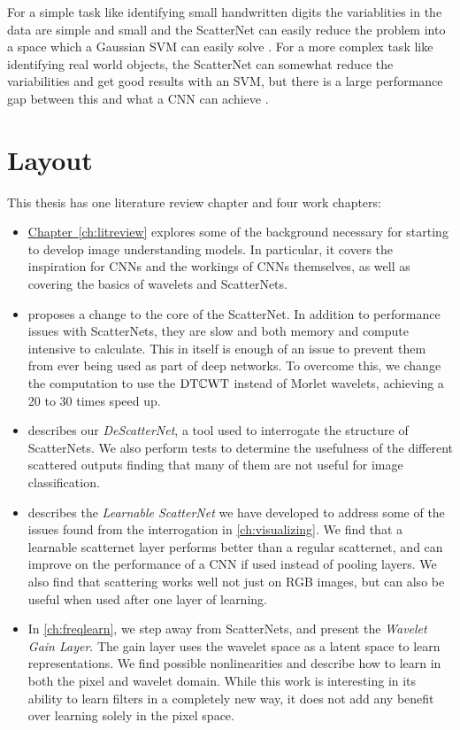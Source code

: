 For a simple task like identifying small handwritten digits
the variablities in the data are simple and small and the ScatterNet can easily
reduce the problem into a space which a Gaussian SVM can easily solve
\cite{bruna_invariant_2013}. For a more complex task like identifying real world
objects, the ScatterNet can somewhat reduce the variabilities and get good
results with an SVM, but there is a large performance gap between this and what a CNN can achieve
\cite{oyallon_deep_2015}.

\section{Layout}
This thesis has one literature review chapter and four work chapters:
\begin{itemize}
\item
  \hyperref[ch:litreview]{Chapter~\ref*{ch:litreview}} 
  explores some of the background necessary for starting
  to develop image understanding models. In particular, it covers the
  inspiration for CNNs and the workings of CNNs themselves, as well as covering
  the basics of wavelets and ScatterNets.
\item 
   proposes a change to the core of the ScatterNet. In
  addition to performance issues with ScatterNets, they are slow and both
  memory and compute intensive to calculate. This in itself is enough of an
  issue to prevent them from ever being used as part of deep networks. To
  overcome this, we change the computation to use the $\mathrm{DT}\mathbb{C}\mathrm{WT}$
  \cite{selesnick_dual-tree_2005} instead of Morlet wavelets, achieving a 20 to
  30 times speed up.
\item 
   describes our \emph{DeScatterNet}, a tool used to
  interrogate the structure of ScatterNets. We also perform tests to determine
  the usefulness of the different scattered outputs finding that many of them
  are not useful for image classification.
\item 
   describes the \emph{Learnable ScatterNet} we have developed to 
  address some of the issues found from the interrogation in
  \autoref{ch:visualizing}. We find that a learnable scatternet layer performs
  better than a regular scatternet, and can improve on the performance of a CNN 
  if used instead of pooling layers. We also find that scattering works well not
  just on RGB images, but can also be useful when used after one layer of
  learning.
\item
  In \autoref{ch:freqlearn}, we step away from ScatterNets, and present the
  \emph{Wavelet Gain Layer}. The gain layer uses 
  the wavelet space as a latent space to learn representations. We find possible
  nonlinearities and describe how to learn in both the pixel and wavelet domain.
  While this work is interesting in its ability to learn filters in a completely
  new way, it does not add any benefit over learning solely in the pixel space.
\end{itemize}

